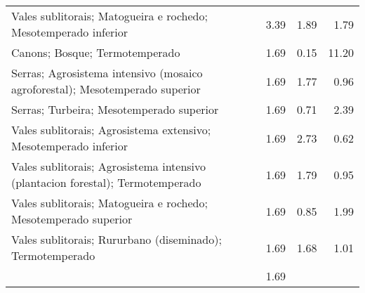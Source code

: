 \begin{table}[p]
\begin{tabular}{lrrr}
  Vales sublitorais; Matogueira e rochedo; Mesotemperado inferior & 3.39 & 1.89 & 1.79 \\ 
  Canons; Bosque; Termotemperado & 1.69 & 0.15 & 11.20 \\ 
  Serras; Agrosistema intensivo (mosaico agroforestal); Mesotemperado superior & 1.69 & 1.77 & 0.96 \\ 
  Serras; Turbeira; Mesotemperado superior & 1.69 & 0.71 & 2.39 \\ 
  Vales sublitorais; Agrosistema extensivo; Mesotemperado inferior & 1.69 & 2.73 & 0.62 \\ 
  Vales sublitorais; Agrosistema intensivo (plantacion forestal); Termotemperado & 1.69 & 1.79 & 0.95 \\ 
  Vales sublitorais; Matogueira e rochedo; Mesotemperado superior & 1.69 & 0.85 & 1.99 \\ 
  Vales sublitorais; Rururbano (diseminado); Termotemperado & 1.69 & 1.68 & 1.01 \\ 
   & 1.69 &  &  \\ 
   \hline
\end{tabular}
\end{table}
